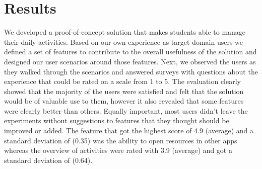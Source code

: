 \section{Results}
We developed a proof-of-concept solution that makes students able to manage their daily activities. Based on our own experience as target domain users we defined a set of features to contribute to the overall usefulness of the solution and designed our user scenarios around those features. Next, we observed the users as they walked through the scenarios and answered surveys with questions about the experience that could be rated on a scale from 1 to 5. The evaluation clearly showed that the majority of the users were satisfied and felt that the solution would be of valuable use to them, however it also revealed that some features were clearly better than others. Equally important, most users didn't leave the experiments without suggestions to features that they thought should be improved or added. The feature that got the highest score of 4.9 (average) and a standard deviation of (0.35) was the ability to open resources in other apps whereas the overview of activities were rated with 3.9 (average) and got a standard deviation of (0.64).
